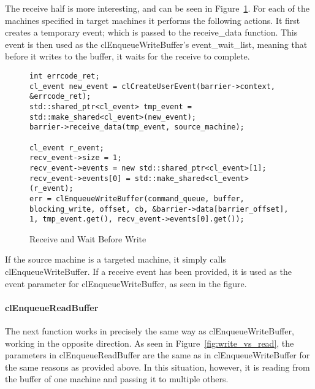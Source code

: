 \documentclass[../thesis.tex]{subfiles}
\begin{document}
            The receive half is more interesting, and can be seen in Figure~\ref{fig:receive_and_wait}. For each of the machines specified in target machines it performs the following actions. It first creates a temporary event; which is passed to the receive\_data function. This event is then used as the clEnqueueWriteBuffer's event\_wait\_list, meaning that before it writes to the buffer, it waits for the receive to complete.

            \begin{figure}[htbp]
                \centering
                \lstset{language=cpp}
                \begin{lstlisting}[tabsize=2]
int errcode_ret;
cl_event new_event = clCreateUserEvent(barrier->context, &errcode_ret);
std::shared_ptr<cl_event> tmp_event = std::make_shared<cl_event>(new_event);
barrier->receive_data(tmp_event, source_machine);

cl_event r_event;
recv_event->size = 1;
recv_event->events = new std::shared_ptr<cl_event>[1];
recv_event->events[0] = std::make_shared<cl_event>(r_event);
err = clEnqueueWriteBuffer(command_queue, buffer, blocking_write, offset, cb, &barrier->data[barrier_offset], 1, tmp_event.get(), recv_event->events[0].get());

                \end{lstlisting}
                \caption{Receive and Wait Before Write}
                \label{fig:receive_and_wait}
            \end{figure}

            If the source machine is a targeted machine, it simply calls clEnqueueWriteBuffer. If a receive event has been provided, it is used as the event parameter for clEnqueueWriteBuffer, as seen in the figure.

        \paragraph{clEnqueueReadBuffer} %
        \label{par:clenqueuereadbuffer}
            The next function works in precisely the same way as clEnqueueWriteBuffer, working in the opposite direction. As seen in Figure~\ref{fig:write_vs_read}, the parameters in clEnqueueReadBuffer are the same as in clEnqueueWriteBuffer for the same reasons as provided above. In this situation, however, it is reading from the buffer of one machine and passing it to multiple others.
        
\end{document}

